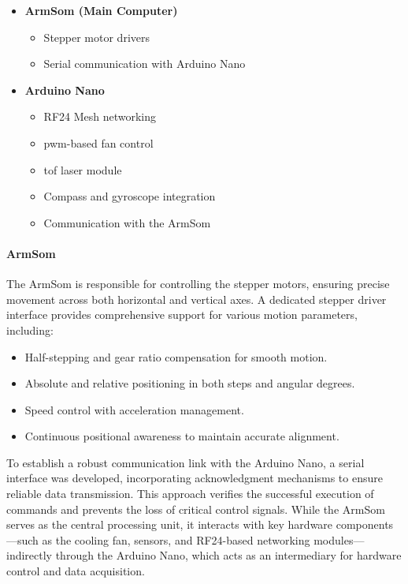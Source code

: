 \begin{itemize}
	\item \textbf{ArmSom (Main Computer)}
	\begin{itemize}
		\item Stepper motor drivers
		\item Serial communication with Arduino Nano
	\end{itemize}
	\item \textbf{Arduino Nano}
	\begin{itemize}
		\item RF24 Mesh networking
		\item \acrfull{pwm}-based fan control
		\item \acrshort{tof} laser module
		\item Compass and gyroscope integration
		\item Communication with the ArmSom
	\end{itemize}
\end{itemize}

\paragraph{ArmSom}
The ArmSom is responsible for controlling the stepper motors, ensuring precise movement across both horizontal and vertical axes. A dedicated stepper driver interface provides comprehensive support for various motion parameters, including:
\begin{itemize}
	\item Half-stepping and gear ratio compensation for smooth motion.
	\item Absolute and relative positioning in both steps and angular degrees.
	\item Speed control with acceleration management.
	\item Continuous positional awareness to maintain accurate alignment.
\end{itemize}

To establish a robust communication link with the Arduino Nano, a serial interface was developed, incorporating acknowledgment mechanisms to ensure reliable data transmission. This approach verifies the successful execution of commands and prevents the loss of critical control signals. While the ArmSom serves as the central processing unit, it interacts with key hardware components—such as the cooling fan, sensors, and RF24-based networking modules—indirectly through the Arduino Nano, which acts as an intermediary for hardware control and data acquisition.

